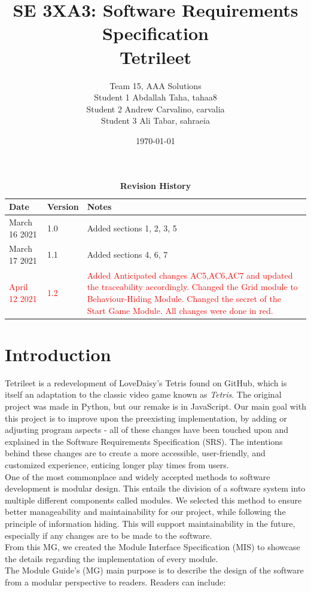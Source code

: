 \documentclass[12pt, titlepage]{article}
\title{SE 3XA3: Software Requirements Specification\\Tetrileet}
\author{Team 15, AAA Solutions
		\\ Student 1 Abdallah Taha, tahaa8
		\\ Student 2 Andrew Carvalino, carvalia
		\\ Student 3 Ali Tabar, sahraeia
}
\date{\today}
\begin{document}
\maketitle

\tableofcontents
\listoftables
\listoffigures
\newpage
\begin{table}[h!]
\caption{\bf Revision History}
\begin{tabularx}{\textwidth}{p{3cm}p{2cm}X}
\toprule {\bf Date} & {\bf Version} & {\bf Notes}\\
\midrule
March 16 2021 & 1.0 & Added sections 1, 2, 3, 5\\
March 17 2021 & 1.1 & Added sections 4, 6, 7\\
\textcolor{red}{April 12 2021} & \textcolor{red}{1.2} & \textcolor{red}{Added Anticipated changes AC5,AC6,AC7 and updated the traceability accordingly. Changed the Grid module to Behaviour-Hiding Module. Changed the secret of the Start Game Module. All changes were done in red.}\\
\bottomrule
\end{tabularx}
\end{table}

\newpage


\section{Introduction}





Tetrileet is a redevelopment of LoveDaisy's Tetris found on GitHub, which is itself an adaptation to the classic video game known as \textit{Tetris}. The original project was made in Python, but our remake is in JavaScript. Our main goal with this project is to improve upon the preexisting implementation, by adding or adjusting program aspects - all of these changes have been touched upon and explained in the Software Requirements Specification (SRS). The intentions behind these changes are to create a more accessible, user-friendly, and customized experience, enticing longer play times from users.
\\One of the most commonplace and widely accepted methods to software development is modular design. This entails the division of a software system into multiple different components called modules. We selected this method to ensure better manageability and maintainability for our project, while following the principle of information hiding. This will support maintainability in the future, especially if any changes are to be made to the software.\\
From this MG, we created the Module Interface Specification (MIS) to showcase the details regarding the implementation of every module.
\\The Module Guide's (MG) main purpose is to describe the design of the software from a modular perspective to readers. Readers can include:
\end{document}
